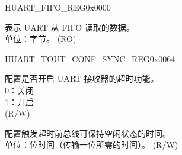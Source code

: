 \begin{register}{H}{UART\_FIFO\_REG}{0x0000}\label{regdesc:UARTFIFOREG}
%
%
\regnewline%
\begin{regdesc}\begin{reglist}
\label{fielddesc:UARTRXFIFORDBYTE}\item [UART\_RXFIFO\_RD\_BYTE] 表示 UART  从 FIFO 读取的数据。\\单位：字节。 (RO)
\end{reglist}\end{regdesc}
\end{register}



\begin{register}{H}{UART\_TOUT\_CONF\_SYNC\_REG}{0x0064}\label{regdesc:UARTTOUTCONFSYNCREG}
%
%
%
%
\regnewline%
\begin{regdesc}\begin{reglist}
\label{fielddesc:UARTRXTOUTEN}\item [UART\_RX\_TOUT\_EN] 配置是否开启 UART 接收器的超时功能。\\
0：关闭\\
1：开启\\ (R/W)
\label{fielddesc:UARTRXTOUTTHRHD}\item [UART\_RX\_TOUT\_THRHD] 配置触发超时前总线可保持空闲状态的时间。\\单位：位时间（传输一位所需的时间）。 (R/W)
\end{reglist}\end{regdesc}
\end{register}


